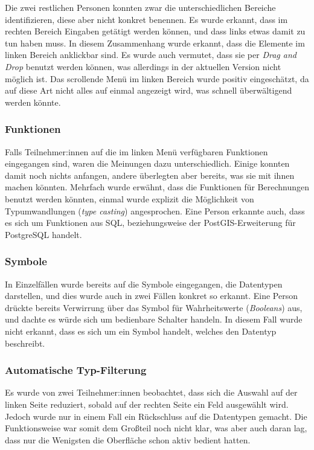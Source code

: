 Die zwei restlichen Personen konnten zwar die unterschiedlichen Bereiche identifizieren, diese aber nicht konkret benennen. Es wurde erkannt, dass im rechten Bereich Eingaben getätigt werden können, und dass links etwas damit zu tun haben muss. In diesem Zusammenhang wurde erkannt, dass die Elemente im linken Bereich anklickbar sind. Es wurde auch vermutet, dass sie per \textit{Drag and Drop} benutzt werden können, was allerdings in der aktuellen Version nicht möglich ist. Das scrollende Menü im linken Bereich wurde positiv eingeschätzt, da auf diese Art nicht alles auf einmal angezeigt wird, was schnell überwältigend werden könnte.

\subsubsection{Funktionen}

Falls Teilnehmer:innen auf die im linken Menü verfügbaren Funktionen eingegangen sind, waren die Meinungen dazu unterschiedlich. Einige konnten damit noch nichts anfangen, andere überlegten aber bereits, was sie mit ihnen machen könnten. Mehrfach wurde erwähnt, dass die Funktionen für Berechnungen benutzt werden könnten, einmal wurde explizit die Möglichkeit von Typumwandlungen (\textit{type casting}) angesprochen. Eine Person erkannte auch, dass es sich um Funktionen aus SQL, beziehungsweise der PostGIS-Erweiterung für PostgreSQL handelt.

\subsubsection{Symbole}

In Einzelfällen wurde bereits auf die Symbole eingegangen, die Datentypen darstellen, und dies wurde auch in zwei Fällen konkret so erkannt. Eine Person drückte bereits Verwirrung über das Symbol für Wahrheitswerte (\textit{Booleans}) aus, und dachte es würde sich um bedienbare Schalter handeln. In diesem Fall wurde nicht erkannt, dass es sich um ein Symbol handelt, welches den Datentyp beschreibt.

\subsubsection{Automatische Typ-Filterung}

Es wurde von zwei Teilnehmer:innen beobachtet, dass sich die Auswahl auf der linken Seite reduziert, sobald auf der rechten Seite ein Feld ausgewählt wird. Jedoch wurde nur in einem Fall ein Rückschluss auf die Datentypen gemacht. Die Funktionsweise war somit dem Großteil noch nicht klar, was aber auch daran lag, dass nur die Wenigsten die Oberfläche schon aktiv bedient hatten.

